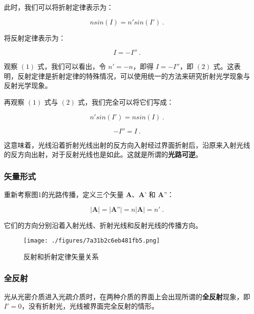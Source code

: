 此时，我们可以将折射定律表示为：

\begin{equation}
nsin(I)=n'sin(I') ~.
\end{equation}

将反射定律表示为：

\begin{equation}
I=-I'' ~.
\end{equation}

观察 $(1)$ 式，我们可以看出，令 $n'=-n$，即得 $I=-I''$，即 $(2)$ 式。这表明，反射定律是折射定律的特殊情况，可以使用统一的方法来研究折射光学现象与反射光学现象。

再观察 $(1)$ 式与 $(2)$ 式，我们完全可以将它们写成：

\begin{equation}
n'sin(I')=nsin(I) ~.
\end{equation}

\begin{equation}
-I''=I ~.
\end{equation}

这意味着，光线沿着折射光线出射的反方向入射经过界面折射后，沿原来入射光线的反方向出射，对于反射光线也是如此。这就是所谓的\textbf{光路可逆}。

\subsubsection{矢量形式}

重新考察图1的光路传播，定义三个矢量 $\textbf{A}$、$\textbf{A'}$ 和 $\textbf{A''}$：

\begin{equation}
\left| \textbf{A} \right| = \left| \textbf{A''} \right| = n
\left| \textbf{A} \right| = n' ~.
\end{equation}

它们的方向分别沿着入射光线、折射光线和反射光线的传播方向。

\begin{figure}[ht]
\centering
\texttt{[image: ./figures/7a31b2c6eb481fb5.png]}
\caption{反射和折射定律矢量关系} \label{fig_GeOp2_2}
\end{figure}

\subsubsection{全反射}

光从光密介质进入光疏介质时，在两种介质的界面上会出现所谓的\textbf{全反射}现象，即 $I'=0$，没有折射光，光线被界面完全反射的情形。

